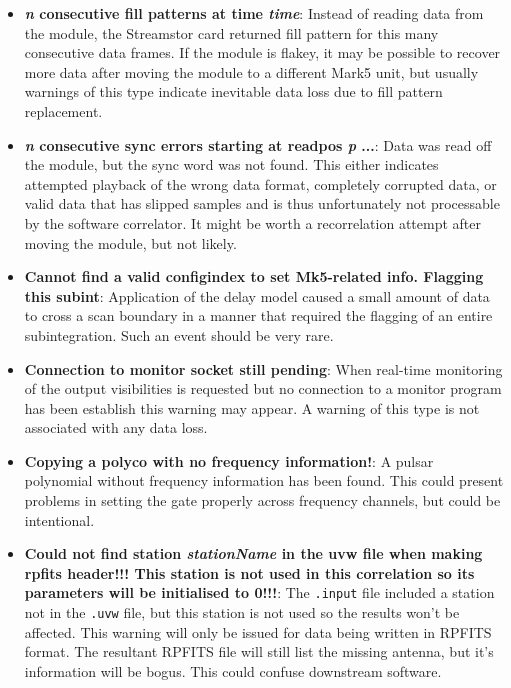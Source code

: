 \begin{itemize}

\item {\bf {\it n} consecutive fill patterns at time {\it time}}:
Instead of reading data from the module, the Streamstor card returned fill pattern for this many consecutive data frames.
If the module is flakey, it may be possible to recover more data after moving the module to a different Mark5 unit, but usually warnings of this type indicate inevitable data loss due to fill pattern replacement.

\item {\bf {\it n} consecutive sync errors starting at readpos {\it p} ...}:
Data was read off the module, but the sync word was not found.
This either indicates attempted playback of the wrong data format, completely corrupted data, or valid data that has slipped samples and is thus unfortunately not processable by the software correlator.
It might be worth a recorrelation attempt after moving the module, but not likely.

\item {\bf Cannot find a valid configindex to set Mk5-related info.  Flagging this subint}:
Application of the delay model caused a small amount of data to cross a scan boundary in a manner that required the flagging of an entire subintegration.
Such an event should be very rare.

\item {\bf Connection to monitor socket still pending}:
When real-time monitoring of the output visibilities is requested but no connection to a monitor program has been establish this warning may appear.
A warning of this type is not associated with any data loss.

\item {\bf Copying a polyco with no frequency information!}:
A pulsar polynomial without frequency information has been found.
This could present problems in setting the gate properly across frequency channels, but could be intentional.

\item {\bf Could not find station {\it stationName} in the uvw file when making rpfits header!!!  This station is not used in this correlation so its parameters will be initialised to 0!!!}:
The {\tt .input} file included a station not in the {\tt .uvw} file, but this station is not used so the results won't be affected.
This warning will only be issued for data being written in RPFITS format.
The resultant RPFITS file will still list the missing antenna, but it's information will be bogus.
This could confuse downstream software.


\end{itemize}
